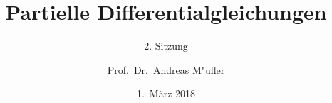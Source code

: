 %
%
%
\usepackage[utf8]{inputenc}
\usepackage[T1]{fontenc}
\usepackage{epic}
\usepackage{color}
\usepackage{array}
\usepackage{ifthen}
\usepackage{tikz}
\usepackage{german}
\usetikzlibrary{shapes.geometric,decorations.pathmorphing}
\beamertemplatenavigationsymbolsempty

\title[]{Partielle Differentialgleichungen}
\subtitle{2. Sitzung}
\date[1.~März 2018]{1.~März 2018}
\author{Prof.~Dr.~Andreas M"uller}

